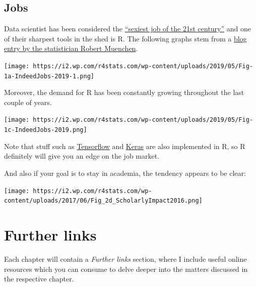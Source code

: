 \documentclass[
]{book}
\begin{document}
\hypertarget{jobs}{%
\subsection{Jobs}\label{jobs}}

Data scientist has been considered the \href{https://hbr.org/2012/10/data-scientist-the-sexiest-job-of-the-21st-century}{``sexiest job of the 21st century''} and one of their sharpest tools in the shed is R. The following graphs stem from a \href{http://r4stats.com/articles/popularity/}{blog entry by the statistician Robert Muenchen}.

\texttt{[image: https://i2.wp.com/r4stats.com/wp-content/uploads/2019/05/Fig-1a-IndeedJobs-2019-1.png]}

Moreover, the demand for R has been constantly growing throughout the last couple of years.

\texttt{[image: https://i2.wp.com/r4stats.com/wp-content/uploads/2019/05/Fig-1c-IndeedJobs-2019.png]}

Note that stuff such as \href{https://tensorflow.rstudio.com}{Tensorflow} and \href{https://keras.rstudio.com}{Keras} are also implemented in R, so R definitely will give you an edge on the job market.

And also if your goal is to stay in academia, the tendency appears to be clear:

\texttt{[image: https://i2.wp.com/r4stats.com/wp-content/uploads/2017/06/Fig\_2d\_ScholarlyImpact2016.png]}

\hypertarget{further-links}{%
\section{Further links}\label{further-links}}

Each chapter will contain a \emph{Further links} section, where I include useful online resources which you can consume to delve deeper into the matters discussed in the respective chapter.
\end{document}
